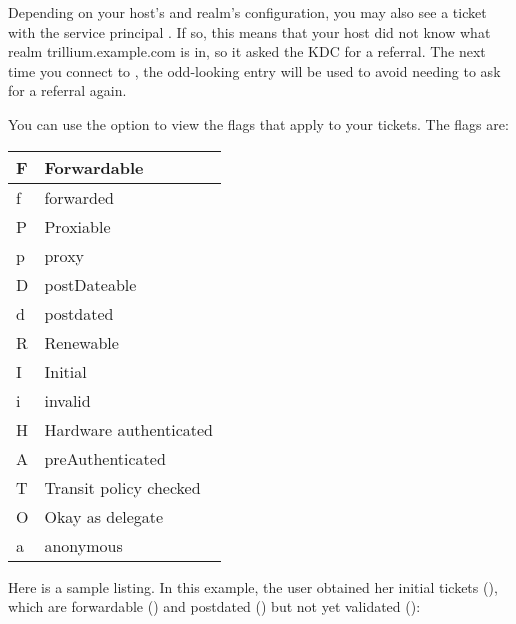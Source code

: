 \documentclass[letterpaper,10pt,english]{sphinxmanual}
\begin{document}
Depending on your host’s and realm’s configuration, you may also see a
ticket with the service principal .  If
so, this means that your host did not know what realm
trillium.example.com is in, so it asked the  KDC for
a referral.  The next time you connect to ,
the odd-looking entry will be used to avoid needing to ask for a
referral again.

You can use the  option to view the flags that apply to your
tickets.  The flags are:


\begin{savenotes}\sphinxattablestart
\centering
\begin{tabulary}{\linewidth}[t]{|T|T|}
\hline

F
&
Forwardable
\\
\hline
f
&
forwarded
\\
\hline
P
&
Proxiable
\\
\hline
p
&
proxy
\\
\hline
D
&
postDateable
\\
\hline
d
&
postdated
\\
\hline
R
&
Renewable
\\
\hline
I
&
Initial
\\
\hline
i
&
invalid
\\
\hline
H
&
Hardware authenticated
\\
\hline
A
&
preAuthenticated
\\
\hline
T
&
Transit policy checked
\\
\hline
O
&
Okay as delegate
\\
\hline
a
&
anonymous
\\
\hline
\end{tabulary}
\par
\sphinxattableend\end{savenotes}

Here is a sample listing.  In this example, the user 
obtained her initial tickets (), which are forwardable ()
and postdated () but not yet validated ():
\end{document}
